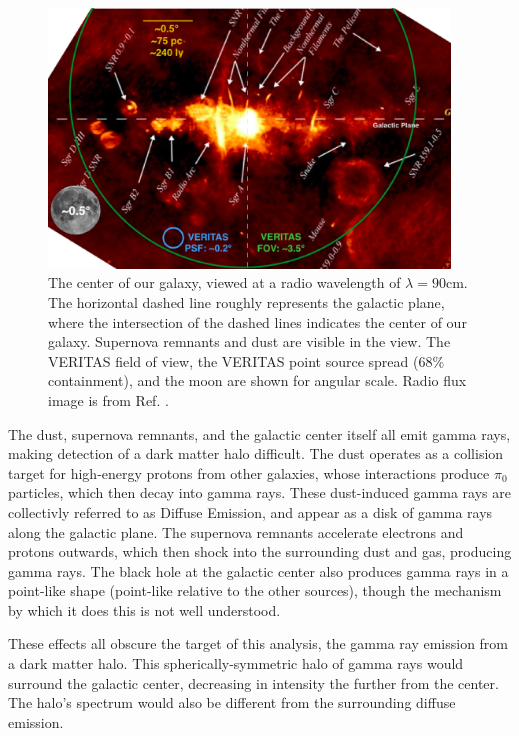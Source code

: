  \begin{figure}[ht]
    \centering
    \includegraphics[width=0.95\textwidth]{images/GalacticCenterInRadio.eps}
    \caption[Galactic Center in Radio]{
      The center of our galaxy, viewed at a radio wavelength of $\lambda=90\text{cm}$.
      The horizontal dashed line roughly represents the galactic plane, where the intersection of the dashed lines indicates the center of our galaxy.
      Supernova remnants and dust are visible in the view.
      The VERITAS field of view, the VERITAS point source spread (68\% containment), and the moon are shown for angular scale.
      Radio flux image is from Ref. \cite{galactic_center_in_radio}.}
    \label{fig_gc_radio}
  \end{figure}

  The dust, supernova remnants, and the galactic center itself all emit gamma rays, making detection of a dark matter halo difficult.
  The dust operates as a collision target for high-energy protons from other galaxies, whose interactions produce $\pi_0$ particles, which then decay into gamma rays.
  These dust-induced gamma rays are collectivly referred to as Diffuse Emission, and appear as a disk of gamma rays along the galactic plane.
  The supernova remnants accelerate electrons and protons outwards, which then shock into the surrounding dust and gas, producing gamma rays.
  The black hole at the galactic center also produces gamma rays in a point-like shape (point-like relative to the other sources), though the mechanism by which it does this is not well understood\cite{gal_cent_still_undetermined}.

  These effects all obscure the target of this analysis, the gamma ray emission from a dark matter halo.
  This spherically-symmetric halo of gamma rays would surround the galactic center, decreasing in intensity the further from the center.
  The halo's spectrum would also be different from the surrounding diffuse emission.

